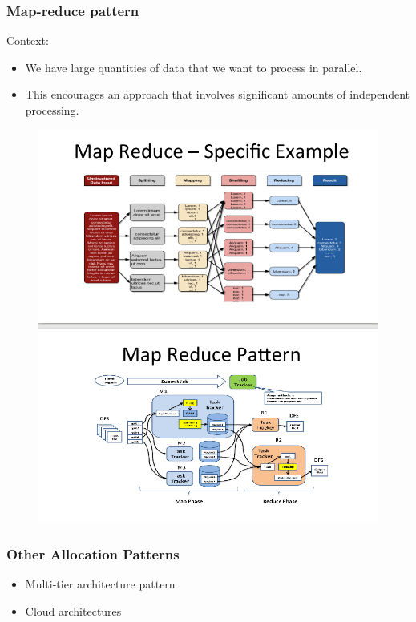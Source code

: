 \documentclass[a4paper]{article}
\begin{document}
\subsubsection{Map-reduce pattern}

Context:
\begin{itemize}
\item
  We have large quantities of data that we want to process in parallel.
\item
  This encourages an approach that involves significant amounts of independent processing.
\end{itemize}

\begin{figure}[H]
\centering
  \includegraphics[width=1\linewidth]
  {images/mapreduce.png}
\end{figure}

\subsubsection{Other Allocation Patterns}

\begin{itemize}
\item
  Multi-tier architecture pattern
\item
  Cloud architectures
\end{itemize}
\end{document}
